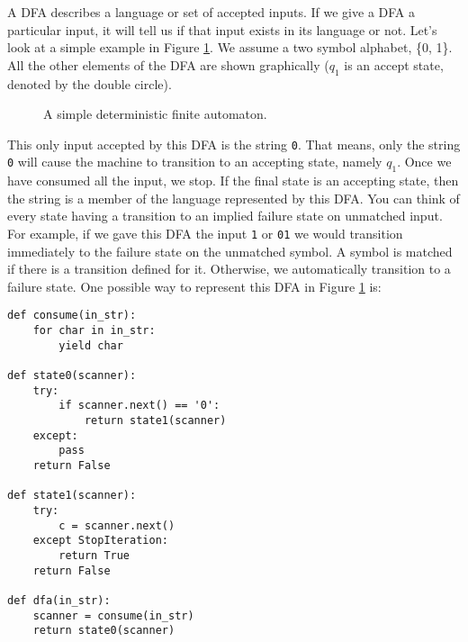 A DFA describes a language or set of accepted inputs.  
If we give a DFA a particular input, it will tell us if that input exists in its language or not.
Let's look at a simple example in Figure \ref{fig:simple_dfa}.  
We assume a two symbol alphabet, \{0, 1\}.  
All the other elements of the DFA are shown graphically ($q_1$ is an accept state, denoted by the double circle).
\begin{figure}
\caption{A simple deterministic finite automaton.}
\label{fig:simple_dfa}
\end{figure}
This only input accepted by this DFA is the string \texttt{0}.
That means, only the string \texttt{0} will cause the machine to transition to an accepting state, namely $q_1$.
Once we have consumed all the input, we stop.
If the final state is an accepting state, then the string is a member of the language represented by this DFA.
You can think of every state having a transition to an implied failure state on unmatched input.
For example, if we gave this DFA the input \texttt{1} or \texttt{01} we would transition immediately to the failure state on the unmatched symbol.
A symbol is matched if there is a transition defined for it.
Otherwise, we automatically transition to a failure state.
One possible way to represent this DFA in Figure \ref{fig:simple_dfa} is:
\begin{lstlisting}
def consume(in_str):
    for char in in_str:
        yield char
    
def state0(scanner):
    try:
        if scanner.next() == '0':
            return state1(scanner)
    except:
        pass
    return False
    
def state1(scanner):
    try:
        c = scanner.next()
    except StopIteration:
        return True
    return False
    
def dfa(in_str):
    scanner = consume(in_str)
    return state0(scanner)
\end{lstlisting}


